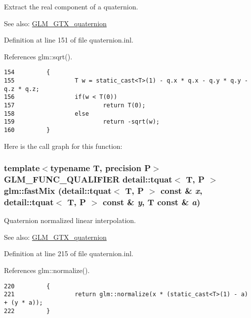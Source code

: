 Extract the real component of a quaternion.

\begin{Desc}
\item[See also:]\hyperlink{group__gtx__quaternion}{GLM\_\-GTX\_\-quaternion} \end{Desc}


Definition at line 151 of file quaternion.inl.

References glm::sqrt().

\begin{Code}\begin{verbatim}154         {
155                 T w = static_cast<T>(1) - q.x * q.x - q.y * q.y - q.z * q.z;
156                 if(w < T(0))
157                         return T(0);
158                 else
159                         return -sqrt(w);
160         }
\end{verbatim}
\end{Code}




Here is the call graph for this function:\hypertarget{group__gtx__quaternion_g0538872e0a23bc7ba865700756c1a3a7}{
\subsubsection[fastMix]{\setlength{\rightskip}{0pt plus 5cm}template$<$typename T, precision P$>$ GLM\_\-FUNC\_\-QUALIFIER detail::tquat$<$ T, P $>$ glm::fastMix (detail::tquat$<$ T, P $>$ const \& {\em x}, \/  detail::tquat$<$ T, P $>$ const \& {\em y}, \/  T const \& {\em a})}}
\label{group__gtx__quaternion_g0538872e0a23bc7ba865700756c1a3a7}


Quaternion normalized linear interpolation.

\begin{Desc}
\item[See also:]\hyperlink{group__gtx__quaternion}{GLM\_\-GTX\_\-quaternion} \end{Desc}


Definition at line 215 of file quaternion.inl.

References glm::normalize().

\begin{Code}\begin{verbatim}220         {
221                 return glm::normalize(x * (static_cast<T>(1) - a) + (y * a));
222         }
\end{verbatim}
\end{Code}




